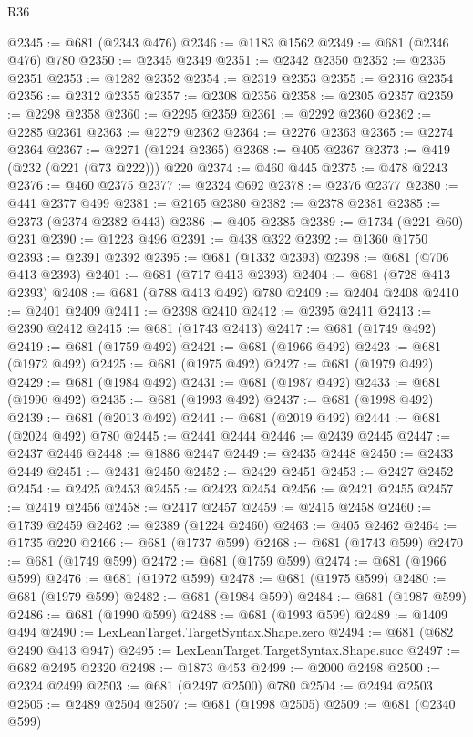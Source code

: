 \begin{lexlean}{R36}
\begin{coremodule}
{{{{{{{{{{{{{{{{{{{{{{{{{{{{{{{{{{{{{{{{{{{{{{{{{{{{{{{{{{{{{{{{{{{{{{{{{{{{{{{{{{@2345 := @681 (@2343 @476)
@2346 := @1183 @1562
@2349 := @681 (@2346 @476) @780
@2350 := @2345 @2349
@2351 := @2342 @2350
@2352 := @2335 @2351
@2353 := @1282 @2352
@2354 := @2319 @2353
@2355 := @2316 @2354
@2356 := @2312 @2355
@2357 := @2308 @2356
@2358 := @2305 @2357
@2359 := @2298 @2358
@2360 := @2295 @2359
@2361 := @2292 @2360
@2362 := @2285 @2361
@2363 := @2279 @2362
@2364 := @2276 @2363
@2365 := @2274 @2364
@2367 := @2271 (@1224 @2365)
@2368 := @405 @2367
@2373 := @419 (@232 (@221 (@73 @222))) @220
@2374 := @460 @445
@2375 := @478 @2243
@2376 := @460 @2375
@2377 := @2324 @692
@2378 := @2376 @2377
@2380 := @441 @2377 @499
@2381 := @2165 @2380
@2382 := @2378 @2381
@2385 := @2373 (@2374 @2382 @443)
@2386 := @405 @2385
@2389 := @1734 (@221 @60) @231
@2390 := @1223 @496
@2391 := @438 @322
@2392 := @1360 @1750
@2393 := @2391 @2392
@2395 := @681 (@1332 @2393)
@2398 := @681 (@706 @413 @2393)
@2401 := @681 (@717 @413 @2393)
@2404 := @681 (@728 @413 @2393)
@2408 := @681 (@788 @413 @492) @780
@2409 := @2404 @2408
@2410 := @2401 @2409
@2411 := @2398 @2410
@2412 := @2395 @2411
@2413 := @2390 @2412
@2415 := @681 (@1743 @2413)
@2417 := @681 (@1749 @492)
@2419 := @681 (@1759 @492)
@2421 := @681 (@1966 @492)
@2423 := @681 (@1972 @492)
@2425 := @681 (@1975 @492)
@2427 := @681 (@1979 @492)
@2429 := @681 (@1984 @492)
@2431 := @681 (@1987 @492)
@2433 := @681 (@1990 @492)
@2435 := @681 (@1993 @492)
@2437 := @681 (@1998 @492)
@2439 := @681 (@2013 @492)
@2441 := @681 (@2019 @492)
@2444 := @681 (@2024 @492) @780
@2445 := @2441 @2444
@2446 := @2439 @2445
@2447 := @2437 @2446
@2448 := @1886 @2447
@2449 := @2435 @2448
@2450 := @2433 @2449
@2451 := @2431 @2450
@2452 := @2429 @2451
@2453 := @2427 @2452
@2454 := @2425 @2453
@2455 := @2423 @2454
@2456 := @2421 @2455
@2457 := @2419 @2456
@2458 := @2417 @2457
@2459 := @2415 @2458
@2460 := @1739 @2459
@2462 := @2389 (@1224 @2460)
@2463 := @405 @2462
@2464 := @1735 @220
@2466 := @681 (@1737 @599)
@2468 := @681 (@1743 @599)
@2470 := @681 (@1749 @599)
@2472 := @681 (@1759 @599)
@2474 := @681 (@1966 @599)
@2476 := @681 (@1972 @599)
@2478 := @681 (@1975 @599)
@2480 := @681 (@1979 @599)
@2482 := @681 (@1984 @599)
@2484 := @681 (@1987 @599)
@2486 := @681 (@1990 @599)
@2488 := @681 (@1993 @599)
@2489 := @1409 @494
@2490 := LexLeanTarget.TargetSyntax.Shape.zero
@2494 := @681 (@682 @2490 @413 @947)
@2495 := LexLeanTarget.TargetSyntax.Shape.succ
@2497 := @682 @2495 @2320
@2498 := @1873 @453
@2499 := @2000 @2498
@2500 := @2324 @2499
@2503 := @681 (@2497 @2500) @780
@2504 := @2494 @2503
@2505 := @2489 @2504
@2507 := @681 (@1998 @2505)
@2509 := @681 (@2340 @599)
}}}}}}}}}}}}}}}}}}}}}}}}}}}}}}}}}}}}}}}}}}}}}}}}}}}}}}}}}}}}}}}}}}}}}}}}}}}}}}}}}}
\end{coremodule}
\end{lexlean}
